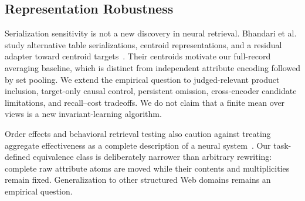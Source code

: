 \subsection{Representation Robustness}
Serialization sensitivity is not a new discovery in neural retrieval. Bhandari et al. study alternative table serializations, centroid representations, and a residual adapter toward centroid targets~\cite{bhandari2026tabular}. Their centroids motivate our full-record averaging baseline, which is distinct from independent attribute encoding followed by set pooling. We extend the empirical question to judged-relevant product inclusion, target-only causal control, persistent omission, cross-encoder candidate limitations, and recall--cost tradeoffs. We do not claim that a finite mean over views is a new invariant-learning algorithm.

Order effects and behavioral retrieval testing also caution against treating aggregate effectiveness as a complete description of a neural system~\cite{abdou2022wordorder,macavaney2022abnirml}. Our task-defined equivalence class is deliberately narrower than arbitrary rewriting: complete raw attribute atoms are moved while their contents and multiplicities remain fixed. Generalization to other structured Web domains remains an empirical question.
